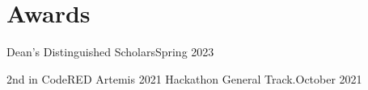 \section{Awards}
\resumeSubHeadingListStart

    \AwardSubheading
    {Dean’s Distinguished Scholars}{Spring 2023}
    
    \AwardSubheading
    {2nd in CodeRED Artemis 2021 Hackathon General Track.}{October 2021}
\resumeSubHeadingListEnd